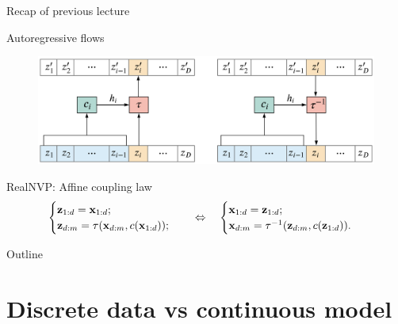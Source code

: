 \begin{frame}{Recap of previous lecture}
	\begin{block}{Autoregressive flows}
		\begin{figure}
			\includegraphics[width=0.9\linewidth]{figs/autoregressive_flow}
		\end{figure}
	\end{block}
	\begin{block}{RealNVP: Affine coupling law}
		\vspace{-0.7cm}
		\[
			\begin{cases} \mathbf{z}_{1:d} = \mathbf{x}_{1:d}; \\ \mathbf{z}_{d:m} = \tau (\mathbf{x}_{d:m}, c(\mathbf{x}_{1:d}));\end{cases} 
			\quad \Leftrightarrow \quad 
			\begin{cases} \mathbf{x}_{1:d} = \mathbf{z}_{1:d}; \\ \mathbf{x}_{d:m} = \tau^{-1} (\mathbf{z}_{d:m}, c(\mathbf{z}_{1:d})).\end{cases}
		\]
	\end{block}
\end{frame}
\begin{frame}{Outline}
	\tableofcontents
\end{frame}
\section{Discrete data vs continuous model}
